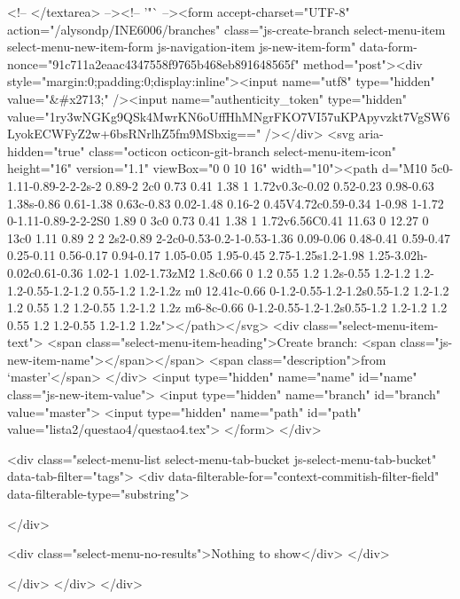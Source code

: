           <!-- </textarea> --><!-- '"` --><form accept-charset="UTF-8" action="/alysondp/INE6006/branches" class="js-create-branch select-menu-item select-menu-new-item-form js-navigation-item js-new-item-form" data-form-nonce="91c711a2eaac4347558f9765b468eb891648565f" method="post"><div style="margin:0;padding:0;display:inline"><input name="utf8" type="hidden" value="&#x2713;" /><input name="authenticity_token" type="hidden" value="1ry3wNGKg9QSk4MwrKN6oUffHhMNgrFKO7VI57uKPApyvzkt7VgSW6LyokECWFyZ2w+6bsRNrlhZ5fm9MSbxig==" /></div>
          <svg aria-hidden="true" class="octicon octicon-git-branch select-menu-item-icon" height="16" version="1.1" viewBox="0 0 10 16" width="10"><path d="M10 5c0-1.11-0.89-2-2-2s-2 0.89-2 2c0 0.73 0.41 1.38 1 1.72v0.3c-0.02 0.52-0.23 0.98-0.63 1.38s-0.86 0.61-1.38 0.63c-0.83 0.02-1.48 0.16-2 0.45V4.72c0.59-0.34 1-0.98 1-1.72 0-1.11-0.89-2-2-2S0 1.89 0 3c0 0.73 0.41 1.38 1 1.72v6.56C0.41 11.63 0 12.27 0 13c0 1.11 0.89 2 2 2s2-0.89 2-2c0-0.53-0.2-1-0.53-1.36 0.09-0.06 0.48-0.41 0.59-0.47 0.25-0.11 0.56-0.17 0.94-0.17 1.05-0.05 1.95-0.45 2.75-1.25s1.2-1.98 1.25-3.02h-0.02c0.61-0.36 1.02-1 1.02-1.73zM2 1.8c0.66 0 1.2 0.55 1.2 1.2s-0.55 1.2-1.2 1.2-1.2-0.55-1.2-1.2 0.55-1.2 1.2-1.2z m0 12.41c-0.66 0-1.2-0.55-1.2-1.2s0.55-1.2 1.2-1.2 1.2 0.55 1.2 1.2-0.55 1.2-1.2 1.2z m6-8c-0.66 0-1.2-0.55-1.2-1.2s0.55-1.2 1.2-1.2 1.2 0.55 1.2 1.2-0.55 1.2-1.2 1.2z"></path></svg>
            <div class="select-menu-item-text">
              <span class="select-menu-item-heading">Create branch: <span class="js-new-item-name"></span></span>
              <span class="description">from ‘master’</span>
            </div>
            <input type="hidden" name="name" id="name" class="js-new-item-value">
            <input type="hidden" name="branch" id="branch" value="master">
            <input type="hidden" name="path" id="path" value="lista2/questao4/questao4.tex">
</form>
      </div>

      <div class="select-menu-list select-menu-tab-bucket js-select-menu-tab-bucket" data-tab-filter="tags">
        <div data-filterable-for="context-commitish-filter-field" data-filterable-type="substring">


        </div>

        <div class="select-menu-no-results">Nothing to show</div>
      </div>

    </div>
  </div>
</div>

